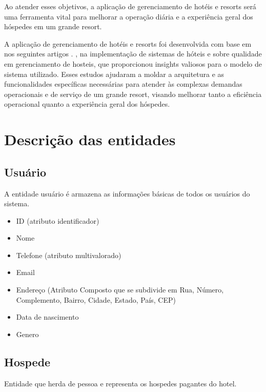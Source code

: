 Ao atender esses objetivos, a aplicação de gerenciamento de hotéis e resorts será uma ferramenta vital para melhorar a operação diária e a experiência geral dos hóspedes em um grande resort.

A aplicação de gerenciamento de hotéis e resorts foi desenvolvida com base em nos seguintes artigos \cite{design_and_implemntation_of_hotel_room_management_system}. \cite{hotel_management_system_GUI}, \cite{design_of_hotel_management_system} na implementação de sistemas de hóteis e \cite{quality_management_in_hotels} sobre qualidade em gerenciamento de hosteis, que proporcionou insights valiosos para o modelo de sistema utilizado. Esses estudos ajudaram a moldar a arquitetura e as funcionalidades específicas necessárias para atender às complexas demandas operacionais e de serviço de um grande resort, visando melhorar tanto a eficiência operacional quanto a experiência geral dos hóspedes.

\newpage

\section{Descrição das entidades}

\subsection{Usuário}

A entidade usuário é armazena as informações básicas de todos os usuários do sistema.

\begin{itemize}
    \item ID (atributo identificador)
    \item Nome
    \item Telefone (atributo multivalorado)
    \item Email
    \item Endereço (Atributo Composto que se subdivide em Rua, Número,
Complemento, Bairro, Cidade, Estado, País, CEP)
    \item Data de nascimento
    \item Genero
\end{itemize}

\subsection{Hospede}

Entidade que herda de pessoa e representa os hospedes pagantes do hotel.

